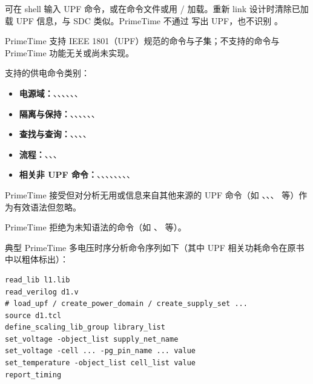 可在 shell 输入 UPF 命令，或在命令文件或用 / 加载。重新 link 设计时清除已加载 UPF 信息，与 SDC 类似。PrimeTime 不通过  写出 UPF，也不识别 。

PrimeTime 支持 IEEE 1801（UPF）规范的命令与子集；不支持的命令与 PrimeTime 功能无关或尚未实现。

支持的供电命令类别：
\begin{itemize}
  \item \textbf{电源域：}、、、、、、
  \item \textbf{隔离与保持：}、、、、、、
  \item \textbf{查找与查询：}、、、、
  \item \textbf{流程：}、、、
  \item \textbf{相关非 UPF 命令：}、、、、、、、、
\end{itemize}

PrimeTime 接受但对分析无用或信息来自其他来源的 UPF 命令（如 、、、 等）作为有效语法但忽略。

PrimeTime 拒绝为未知语法的命令（如 、 等）。

典型 PrimeTime 多电压时序分析命令序列如下（其中 UPF 相关功耗命令在原书中以粗体标出）：
\begin{lstlisting}
read_lib l1.lib
read_verilog d1.v
# load_upf / create_power_domain / create_supply_set ...
source d1.tcl
define_scaling_lib_group library_list
set_voltage -object_list supply_net_name
set_voltage -cell ... -pg_pin_name ... value
set_temperature -object_list cell_list value
report_timing
\end{lstlisting}

